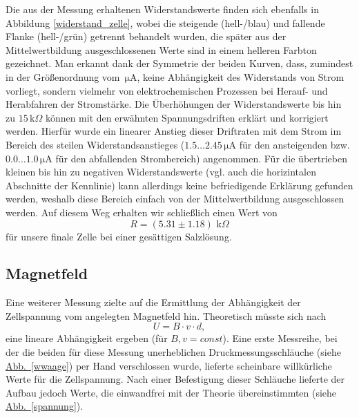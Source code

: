 \documentclass[11pt]{scrartcl}
\newcommand{\unit}[1]{\ensuremath{\,\mathrm{#1}}} %
\begin{document}
Die aus der Messung erhaltenen Widerstandswerte finden sich ebenfalls in Abbildung \ref{widerstand_zelle}, wobei die steigende (hell-/blau) und fallende Flanke (hell-/grün) getrennt behandelt wurden, die später aus der Mittelwertbildung ausgeschlossenen Werte sind in einem helleren Farbton gezeichnet. Man erkannt dank der Symmetrie der beiden Kurven, dass, zumindest in der Größenordnung vom $\unit{\mu A}$, keine Abhängigkeit des Widerstands von Strom vorliegt, sondern vielmehr von elektrochemischen Prozessen bei Herauf- und Herabfahren der Stromstärke.
Die Überhöhungen der Widerstandswerte bis hin zu $15 \unit{k}\Omega$ können mit den erwähnten Spannungsdriften  erklärt und korrigiert werden. Hierfür wurde ein linearer Anstieg dieser Driftraten mit dem Strom im Bereich des steilen Widerstandsanstieges ($1.5\ldots2.45 \unit{\mu A}$ für den ansteigenden bzw. $0.0\ldots1.0 \unit{\mu A}$ für den abfallenden Strombereich) angenommen. Für die übertrieben kleinen bis hin zu negativen Widerstandswerte (vgl. auch die horizintalen Abschnitte der Kennlinie) kann allerdings keine befriedigende Erklärung gefunden werden, weshalb diese Bereich einfach von der Mittelwertbildung ausgeschlossen werden. Auf diesem Weg erhalten wir schließlich einen Wert von
\begin{equation}
R = (5.31 \pm 1.18) \, \unit{k}\Omega
\end{equation}
für unsere finale Zelle bei einer gesättigen Salzlösung.


\subsection{Magnetfeld}		 	%
Eine weiterer Messung zielte auf die Ermittlung der Abhängigkeit der Zellspannung vom angelegten Magnetfeld hin. Theoretisch müsste sich nach
\begin{equation}
U = B \cdot v \cdot d,
\end{equation}
eine lineare Abhängigkeit ergeben (für $B,v=const$). Eine erste Messreihe, bei der die beiden für diese Messung unerheblichen Druckmessungsschläuche (siehe \hyperref[wwaage]{Abb.~\ref{wwaage}}) per Hand verschlossen wurde, lieferte scheinbare willkürliche Werte für die Zellspannung. Nach einer Befestigung dieser Schläuche lieferte der Aufbau jedoch Werte, die einwandfrei mit der Theorie übereinstimmten (siehe \hyperref[spannung]{Abb.~\ref{spannung}}). \
\end{document}
